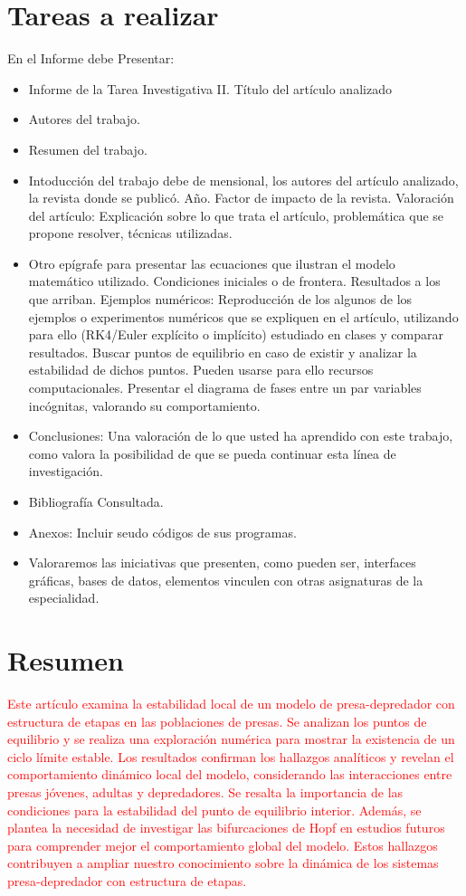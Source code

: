 \documentclass{wscpaperproc}
\theoremstyle{wsc}
\begin{document}
\maketitle
\section*{Tareas a realizar}
En el Informe debe Presentar:
\begin{itemize}
	\item Informe de la Tarea Investigativa II. Título del artículo analizado
	\item Autores del trabajo.
	\item Resumen del trabajo.
	\item Intoducción del trabajo debe de mensional, los autores del artículo analizado, la revista donde se publicó. A\~no. Factor de impacto de la revista. Valoración del artículo: Explicación sobre lo que trata el artículo, problemática que se propone resolver, técnicas utilizadas.
	\item Otro epígrafe para presentar las ecuaciones que ilustran el modelo matemático utilizado. Condiciones iniciales o de frontera. Resultados a los que arriban. Ejemplos numéricos: Reproducción de los algunos de los ejemplos o experimentos numéricos que se expliquen en el artículo, utilizando para ello (RK4/Euler explícito o implícito) estudiado en clases y comparar resultados. Buscar puntos de equilibrio en caso de existir y analizar la estabilidad de dichos puntos. Pueden usarse para ello recursos computacionales. Presentar el diagrama de fases entre un par variables incógnitas, valorando su comportamiento.
	\item Conclusiones: Una valoración de lo que usted ha aprendido con este trabajo, como valora la posibilidad de que se pueda continuar esta línea de investigación.
	\item Bibliografía Consultada.
	\item  Anexos: Incluir seudo códigos de sus programas.
	\item Valoraremos las iniciativas que presenten, como pueden ser, interfaces gráficas, bases de datos, elementos  vinculen con otras asignaturas de la especialidad.
\end{itemize}

\section*{Resumen}
\textcolor{red}{Este artículo examina la estabilidad local de un modelo de presa-depredador con estructura de etapas en
	las poblaciones de presas. Se analizan los puntos de equilibrio y se realiza una exploración numérica
	para mostrar la existencia de un ciclo límite estable. Los resultados confirman los hallazgos analíticos
	y revelan el comportamiento dinámico local del modelo, considerando las interacciones entre presas
	jóvenes, adultas y depredadores. Se resalta la importancia de las condiciones para la estabilidad
	del punto de equilibrio interior. Además, se plantea la necesidad de investigar las bifurcaciones
	de Hopf en estudios futuros para comprender mejor el comportamiento global del modelo. Estos hallazgos
	contribuyen a ampliar nuestro conocimiento sobre la dinámica de los sistemas presa-depredador con
	estructura de etapas.}
\end{document}
